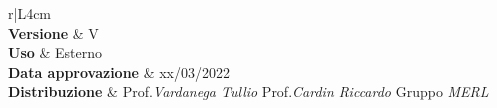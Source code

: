 \centering
\begin{tabular}{r|L{4cm}}
		 \\
		\hline
		\textbf{Versione}			& V \\
		\textbf{Uso}		& Esterno \\
		\textbf{Data approvazione} 			& xx/03/2022 \\
		\textbf{Distribuzione} 	&	Prof.\textit{Vardanega Tullio} \newline Prof.\textit{Cardin Riccardo} \newline Gruppo \textit{MERL} \\
\end{tabular}
